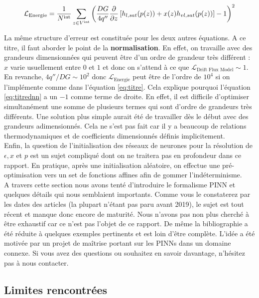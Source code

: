 \begin{equation}
    \mathcal{L}_{\text{Energie}} =\frac{1}{N^{\text{int}}}\sum_{z\in V^{\text{int}}} \left( \frac{DG}{4q''}\frac{\partial}{\partial z}\left[ h_{l,sat}(p(z)) + x(z)h_{vl,sat}(p(z)) \right] -1  \right)^2
    \label{eq:titrednn}
\end{equation}

La même structure d'erreur est constituée pour les deux autres équations. A ce titre, il faut aborder le point de la \textbf{normalisation}. En effet, on travaille avec des grandeurs dimensionnées qui peuvent être d'un ordre de grandeur très différent : $x$ varie usuellement entre $0$ et $1$ et donc on s'attend à ce que $\mathcal{L}_{\text{Drift Flux Model}}\sim 1$. En revanche, $4q''/DG \sim 10^2$ donc $\mathcal{L}_{\text{Energie}}$ peut être de l'ordre de $10^4$ si on l'implémente comme dans l'équation \ref{eq:titre}. Cela explique pourquoi l'équation \ref{eq:titrednn} a un $-1$ comme terme de droite. En effet, il est difficile d'optimiser simultanément une somme de plusieurs termes qui sont d'ordre de grandeurs très différents. Une solution plus simple aurait été de travailler dès le début avec des grandeurs adimensionnés. Cela ne s'est pas fait car il y a beaucoup de relations thermodynamiques et de coefficients dimensionnés définis implicitement.\\

Enfin, la question de l'initialisation des réseaux de neurones pour la résolution de $\epsilon, x$ et $p$ est un sujet compliqué dont on ne traitera pas en profondeur dans ce rapport. En pratique, après une initialisation aléatoire, on effectue une pré-optimisation vers un set de fonctions affines afin de gommer \og l'indéterminisme\fg{}.\\


A travers cette section nous avons tenté d'introduire le formalisme PINN et quelques détails qui nous semblaient importants. Comme vous le constaterez par les dates des articles (la plupart n'étant pas paru avant 2019), le sujet est tout récent et manque donc encore de maturité. Nous n'avons pas non plus cherché à être exhaustif car ce n'est pas l'objet de ce rapport. De même la bibliographie a été réduite à quelques exemples pertinents et est loin d'être complète. L'idée a été motivée par un projet de maîtrise portant sur les PINNs dans un domaine connexe. Si vous avez des questions ou souhaitez en savoir davantage, n'hésitez pas à nous contacter.

\subsection{Limites rencontrées}

